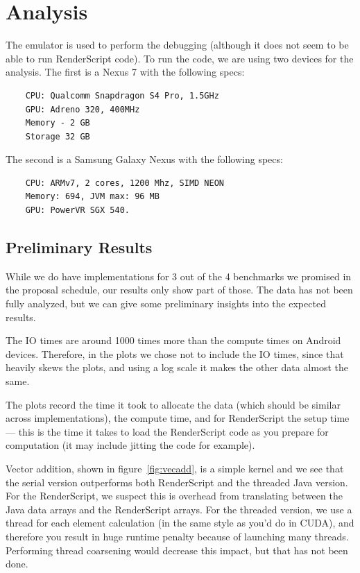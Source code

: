 \section*{Analysis}
\label{sec:analysis}

The emulator is used to perform the debugging (although it does not seem to be able to run RenderScript code).
To run the code, we are using two devices for the analysis.
The first is a Nexus 7 with the following specs:

\begin{verbatim}
    CPU: Qualcomm Snapdragon S4 Pro, 1.5GHz
    GPU: Adreno 320, 400MHz
    Memory - 2 GB
    Storage 32 GB
\end{verbatim}

The second is a Samsung Galaxy Nexus with the following specs:

\begin{verbatim}
    CPU: ARMv7, 2 cores, 1200 Mhz, SIMD NEON
    Memory: 694, JVM max: 96 MB
    GPU: PowerVR SGX 540.
\end{verbatim}


\subsection*{Preliminary Results}

While we do have implementations for 3 out of the 4 benchmarks we promised in the proposal schedule,
  our results only show part of those.
The data has not been fully analyzed, but we can give some preliminary insights into the expected
  results.

The IO times are around 1000 times more than the compute times on Android devices.
Therefore, in the plots we chose not to include the IO times, since that heavily skews
  the plots, and using a log scale it makes the other data almost the same.

The plots record the time it took to allocate the data (which should be similar across implementations),
  the compute time, and for RenderScript the setup time --- this is the time it takes to load the RenderScript code as you prepare for computation (it may include jitting the code for example).

Vector addition, shown in figure~\ref{fig:vecadd}, is a simple kernel and we see that the serial version outperforms both RenderScript
  and the threaded Java version.
For the RenderScript, we suspect this is overhead from translating between the Java data arrays and
  the RenderScript arrays.
For the threaded version, we use a thread for each element calculation (in the same style as you'd do in CUDA), and therefore you result in huge runtime penalty because of launching many threads.
Performing thread coarsening would decrease this impact, but that has not been done. 

